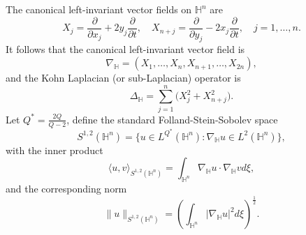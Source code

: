 \documentclass[11pt]{article}
\begin{document}
The canonical left-invariant vector fields on $\mathbb{H}^{n}$ are
\begin{equation*}
	X_{j}=\frac{\partial }{\partial x_{j}}+2y_{j}\frac{\partial }{\partial t},\quad X_{n+j}=\frac{\partial}{\partial y_{j}}-2x_{j}\frac{\partial}{\partial t},\quad j=1, \ldots, n.
\end{equation*}
It follows that the canonical left-invariant vector field is
\begin{equation*}
	\nabla_{\mathbb{H}}=(X_{1}, \ldots, X_{n},X_{n+1}, \ldots, X_{2n}),
\end{equation*}
and the Kohn Laplacian (or sub-Laplacian) operator is %
\begin{equation*}
	\Delta_{\mathbb{H}}=\mathop{\sum}\limits_{j=1}^{n}\big(X_{j}^{2}+X_{n+j}^{2}\big).
\end{equation*}
Let $Q^{\ast}=\frac{2Q}{Q-2}$, define the standard Folland-Stein-Sobolev space
\begin{equation*}
	S^{1,2}(\mathbb{H}^{n})=\Big\{u\in L^{Q^{\ast}}(\mathbb{H}^{n}):\nabla_{\mathbb{H}}u\in L^{2}(\mathbb{H}^{n})\Big\},
\end{equation*}
with the inner product
\begin{equation*}
\langle u,v\rangle_{S^{1,2}(\mathbb{H}^{n})}=\int_{\mathbb{H}^{n}}\nabla_{\mathbb{H}}u\cdot\nabla_{\mathbb{H}}v{d}\xi,
\end{equation*}
and the corresponding norm
\begin{equation*} \|u\|_{S^{1,2}(\mathbb{H}^{n})}=\left(\int_{\mathbb{H}^{n}}|\nabla_{\mathbb{H}}u|^{2}{d}\xi\right)^{\frac{1}{2}}.
\end{equation*}
\end{document}
